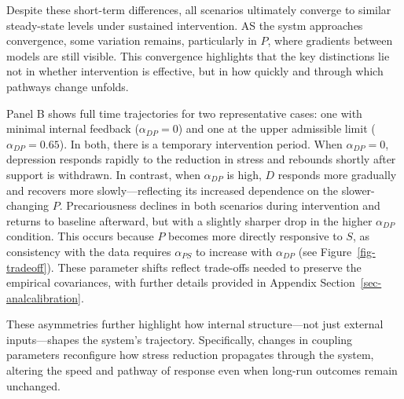 \documentclass[
]{article}
\begin{document}
Despite these short-term differences, all scenarios ultimately converge
to similar steady-state levels under sustained intervention. AS the
systm approaches convergence, some variation remains, particularly in
\(P\), where gradients between models are still visible. This
convergence highlights that the key distinctions lie not in whether
intervention is effective, but in how quickly and through which pathways
change unfolds.

Panel B shows full time trajectories for two representative cases: one
with minimal internal feedback (\(\alpha_{DP} = 0\)) and one at the
upper admissible limit (\(\alpha_{DP} = 0.65\)). In both, there is a
temporary intervention period. When \(\alpha_{DP} = 0\), depression
responds rapidly to the reduction in stress and rebounds shortly after
support is withdrawn. In contrast, when \(\alpha_{DP}\) is high, \(D\)
responds more gradually and recovers more slowly---reflecting its
increased dependence on the slower-changing \(P\). Precariousness
declines in both scenarios during intervention and returns to baseline
afterward, but with a slightly sharper drop in the higher
\(\alpha_{DP}\) condition. This occurs because \(P\) becomes more
directly responsive to \(S\), as consistency with the data requires
\(\alpha_{PS}\) to increase with \(\alpha_{DP}\) (see
Figure~\ref{fig-tradeoff}). These parameter shifts reflect trade-offs
needed to preserve the empirical covariances, with further details
provided in Appendix Section~\ref{sec-analcalibration}.

These asymmetries further highlight how internal structure---not just
external inputs---shapes the system's trajectory. Specifically, changes
in coupling parameters reconfigure how stress reduction propagates
through the system, altering the speed and pathway of response even when
long-run outcomes remain unchanged.

\end{document}
